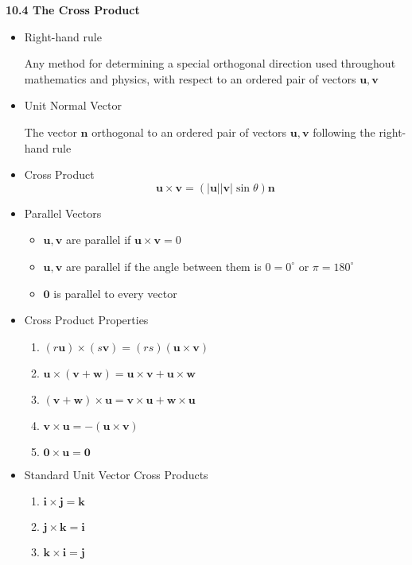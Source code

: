 \documentclass[12pt]{article}
\newcommand{\vect}[1]{\mathbf{#1}}
\newcommand{\veci}{\mathbf{i}}
\newcommand{\vecj}{\mathbf{j}}
\newcommand{\veck}{\mathbf{k}}
\newcommand{\<}{\left<}
\renewcommand{\>}{\right>}
\begin{document}
\newpage

\centerline{\bf 10.4 The Cross Product}
	
		\begin{itemize}
		\item Right-hand rule

			Any method for determining a special orthogonal direction used throughout mathematics and physics, with respect to an ordered pair of vectors $\vect{u},\vect{v}$
			
		\item Unit Normal Vector

		  The vector $\vect{n}$ orthogonal to an ordered pair of vectors $\vect{u},\vect{v}$ following the right-hand rule
		
		\item Cross Product
		 	\[\vect{u} \times \vect{v} = (|\vect{u}||\vect{v}|\sin \theta) \vect{n} \]
		
		\item Parallel Vectors
			\begin{itemize}
			\item	$\vect{u},\vect{v}$ are parallel if $\vect{u} \times \vect{v} = 0$
			\item $\vect{u},\vect{v}$ are parallel if the angle between them is $0=0^\circ$ or $\pi = 180^\circ$
			\item $\vect{0}$ is parallel to every vector
			\end{itemize}
		
		\item Cross Product Properties
		
			\begin{enumerate}
			\item $(r\vect{u}) \times (s\vect{v}) = (rs)(\vect{u} \times \vect{v})$
			\item $\vect{u} \times (\vect{v} + \vect{w}) = \vect{u} \times \vect{v} + \vect{u} \times \vect{w}$
			\item $(\vect{v} + \vect{w}) \times \vect{u} = \vect{v} \times \vect{u} + \vect{w} \times \vect{u}$
			\item $\vect{v} \times \vect{u} = -(\vect{u} \times \vect{v})$
			\item $\vect{0} \times \vect{u} = \vect{0}$
			\end{enumerate}

		\item Standard Unit Vector Cross Products
			\begin{enumerate}
			\item $\veci \times \vecj = \veck$
			\item $\vecj \times \veck = \veci$
			\item $\veck \times \veci = \vecj$
			\end{enumerate}


\end{itemize}
\end{document}
